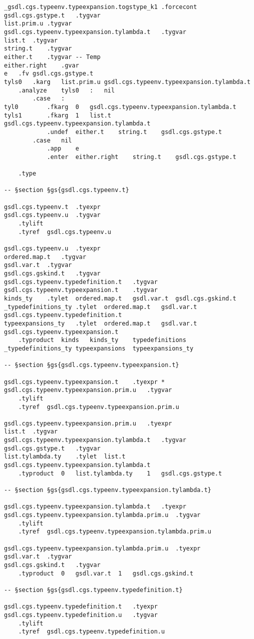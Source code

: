 \documentclass{report}
\begin{document}
\begin{verbatim}
_gsdl.cgs.typeenv.typeexpansion.togstype_k1	.forcecont
gsdl.cgs.gstype.t	.tygvar
list.prim.u	.tygvar
gsdl.cgs.typeenv.typeexpansion.tylambda.t	.tygvar
list.t	.tygvar
string.t	.tygvar
either.t	.tygvar	-- Temp
either.right	.gvar
e	.fv	gsdl.cgs.gstype.t
tyls0	.karg	list.prim.u	gsdl.cgs.typeenv.typeexpansion.tylambda.t
	.analyze	tyls0	:	nil
		.case	:
tyl0		.fkarg	0	gsdl.cgs.typeenv.typeexpansion.tylambda.t
tyls1		.fkarg	1	list.t	gsdl.cgs.typeenv.typeexpansion.tylambda.t
			.undef	either.t	string.t	gsdl.cgs.gstype.t
		.case	nil
			.app	e
			.enter	either.right	string.t	gsdl.cgs.gstype.t

	.type

-- §section §gs{gsdl.cgs.typeenv.t}

gsdl.cgs.typeenv.t	.tyexpr
gsdl.cgs.typeenv.u	.tygvar
	.tylift
	.tyref	gsdl.cgs.typeenv.u

gsdl.cgs.typeenv.u	.tyexpr
ordered.map.t	.tygvar
gsdl.var.t	.tygvar
gsdl.cgs.gskind.t	.tygvar
gsdl.cgs.typeenv.typedefinition.t	.tygvar
gsdl.cgs.typeenv.typeexpansion.t	.tygvar
kinds_ty	.tylet	ordered.map.t	gsdl.var.t	gsdl.cgs.gskind.t
_typedefinitions_ty	.tylet	ordered.map.t	gsdl.var.t	gsdl.cgs.typeenv.typedefinition.t
typeexpansions_ty	.tylet	ordered.map.t	gsdl.var.t	gsdl.cgs.typeenv.typeexpansion.t
	.typroduct	kinds	kinds_ty	typedefinitions	_typedefinitions_ty	typeexpansions	typeexpansions_ty

-- §section §gs{gsdl.cgs.typeenv.typeexpansion.t}

gsdl.cgs.typeenv.typeexpansion.t	.tyexpr	*
gsdl.cgs.typeenv.typeexpansion.prim.u	.tygvar
	.tylift
	.tyref	gsdl.cgs.typeenv.typeexpansion.prim.u

gsdl.cgs.typeenv.typeexpansion.prim.u	.tyexpr
list.t	.tygvar
gsdl.cgs.typeenv.typeexpansion.tylambda.t	.tygvar
gsdl.cgs.gstype.t	.tygvar
list.tylambda.ty	.tylet	list.t	gsdl.cgs.typeenv.typeexpansion.tylambda.t
	.typroduct	0	list.tylambda.ty	1	gsdl.cgs.gstype.t

-- §section §gs{gsdl.cgs.typeenv.typeexpansion.tylambda.t}

gsdl.cgs.typeenv.typeexpansion.tylambda.t	.tyexpr
gsdl.cgs.typeenv.typeexpansion.tylambda.prim.u	.tygvar
	.tylift
	.tyref	gsdl.cgs.typeenv.typeexpansion.tylambda.prim.u

gsdl.cgs.typeenv.typeexpansion.tylambda.prim.u	.tyexpr
gsdl.var.t	.tygvar
gsdl.cgs.gskind.t	.tygvar
	.typroduct	0	gsdl.var.t	1	gsdl.cgs.gskind.t

-- §section §gs{gsdl.cgs.typeenv.typedefinition.t}

gsdl.cgs.typeenv.typedefinition.t	.tyexpr
gsdl.cgs.typeenv.typedefinition.u	.tygvar
	.tylift
	.tyref	gsdl.cgs.typeenv.typedefinition.u


\end{verbatim}
\end{document}
